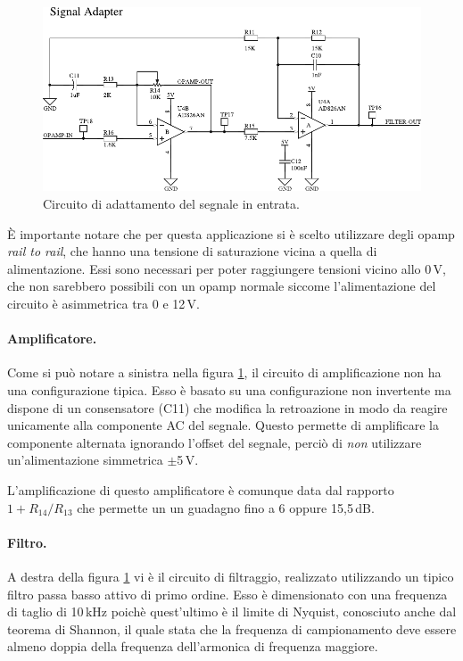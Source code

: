 \begin{figure}[H] \centering
    \includegraphics[width=.8\linewidth]{figures/circuits/filter-ampl.pdf}
    \caption[Circuito di adattamento del segnale]{
        Circuito di adattamento del segnale in entrata.
        \label{fig:filter-ampl}
    }
\end{figure}

\`E importante notare che per questa applicazione si \`e scelto utilizzare
degli opamp \emph{rail to rail}, che hanno una tensione di saturazione vicina
a quella di alimentazione. Essi sono necessari per poter raggiungere tensioni
vicino allo 0\,V, che non sarebbero possibili con un opamp normale siccome
l'alimentazione del circuito \`e asimmetrica tra 0 e 12\,V.

\paragraph{Amplificatore.} Come si pu\`o notare a sinistra nella figura
\ref{fig:filter-ampl}, il circuito di amplificazione non ha una configurazione
tipica. Esso \`e basato su una configurazione non invertente ma dispone di un
consensatore (C11) che modifica la retroazione in modo da reagire unicamente
alla componente AC del segnale. Questo permette di amplificare la componente
alternata ignorando l'offset del segnale, perci\`o di \emph{non} utilizzare
un'alimentazione simmetrica \(\pm\)5\,V.

L'amplificazione di questo amplificatore \`e comunque data dal rapporto
\(1+R_{14}/R_{13}\) che permette un un guadagno fino a 6 oppure 15,5\,dB.


\paragraph{Filtro.} A destra della figura \ref{fig:filter-ampl} vi \`e il
circuito di filtraggio, realizzato utilizzando un tipico filtro passa basso
attivo di primo ordine. Esso \`e dimensionato con una frequenza di taglio di
10\,kHz poich\`e quest'ultimo \`e il limite di Nyquist, conosciuto anche dal
teorema di Shannon, il quale stata che la frequenza di campionamento deve
essere almeno doppia della frequenza dell'armonica di frequenza maggiore.

